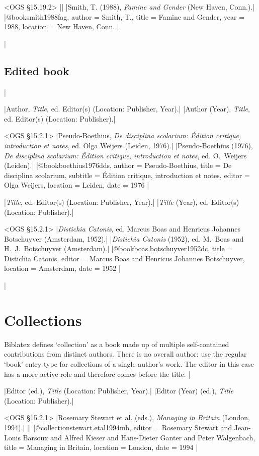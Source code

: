 \documentclass[extrafontsizes,11pt,a4paper,oneside]{memoir}
\newcommand*{\lit}[1]{\textsf{#1}}
\newcommand*{\code}[1]{`\textsf{#1}'}
\begin{document}
\bibexample<OGS \S15.19.2>
||%
|Smith, T. (1988), \emph{Famine and Gender} (New Haven, Conn.).|%
|@book{smith1988fag,
  author = {Smith, T.},
  title = {Famine and Gender},
  year = {1988},
  location = {New Haven, Conn.}
}|

\todoc|
\subsection{Edited book}
|

\specs
|Author, \emph{Title}, \lit{ed.} Editor(s) (Location: Publisher, Year).|%
|Author (Year), \emph{Title}, \lit{ed.} Editor(s) (Location: Publisher).|

\bibexample<OGS \S15.2.1>
|Pseudo-Boethius, \emph{De disciplina scolarium: Édition critique, introduction et notes}, ed. Olga Weijers (Leiden, 1976).|%
|Pseudo-Boethius (1976), \emph{De disciplina scolarium: Édition critique, introduction et notes}, ed. O.\ Weijers (Leiden).|%
|@book{boethius1976dds,
  author = {Pseudo-Boethius},
  title = {De disciplina scolarium},
  subtitle = {Édition critique, introduction et notes},
  editor = {Olga Weijers},
  location = {Leiden},
  date = {1976}
}|

\specs
|\emph{Title}, \lit{ed.} Editor(s) (Location: Publisher, Year).|%
|\emph{Title} (Year), \lit{ed.} Editor(s) (Location: Publisher).|

\bibexample<OGS \S15.2.1>
|\emph{Distichia Catonis}, ed. Marcus Boas and Henricus Johannes Botschuyver (Amsterdam, 1952).|%
|\emph{Distichia Catonis} (1952), ed. M.\ Boas and H.\ J.\ Botschuyver (Amsterdam).|%
|@book{boas.botschuyver1952dc,
  title = {Distichia Catonis},
  editor = {Marcus Boas and Henricus Johannes Botschuyver},
  location = {Amsterdam},
  date = {1952}
}|

\todoc|
\section{Collections}

Biblatex defines \code{collection} as a book made up of multiple self-contained contributions from distinct authors. There is no overall author: use the regular \code{book} entry type for collections of a single author’s work. The editor in this case has a more active role and therefore comes before the title.
|

\specs
|Editor (\lit{ed.}), \emph{Title} (Location: Publisher, Year).|%
|Editor (Year) (\lit{ed.}), \emph{Title} (Location: Publisher).|

\bibexample<OGS \S15.2.1>
|Rosemary Stewart et al. (eds.), \emph{Managing in Britain} (London, 1994).|%
||%
|@collection{stewart.etal1994mb,
  editor = {Rosemary Stewart and Jean-Louis Barsoux and Alfred Kieser and Hans-Dieter Ganter and Peter Walgenbach},
  title = {Managing in {Britain}},
  location = {London},
  date = {1994}
}|
\end{document}
